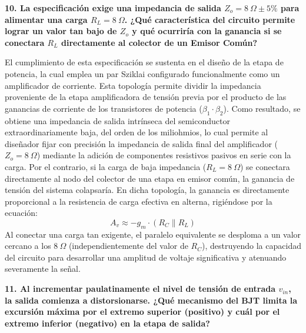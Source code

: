 \textbf{10. La especificación exige una impedancia de salida $Z_o = 8\ \Omega \pm 5\%$ para alimentar una carga $R_L = 8\ \Omega$. ¿Qué característica del circuito permite lograr un valor tan bajo de $Z_o$ y qué ocurriría con la ganancia si se conectara $R_L$ directamente al colector de un Emisor Común?}

El cumplimiento de esta especificación se sustenta en el diseño de la etapa de potencia, la cual emplea un par Sziklai configurado funcionalmente como un amplificador de corriente. Esta topología permite dividir la impedancia proveniente de la etapa amplificadora de tensión previa por el producto de las ganancias de corriente de los transistores de potencia ($\beta_1 \cdot \beta_2$). Como resultado, se obtiene una impedancia de salida intrínseca del semiconductor extraordinariamente baja, del orden de los miliohmios, lo cual permite al diseñador fijar con precisión la impedancia de salida final del amplificador ($Z_o = 8\ \Omega$) mediante la adición de componentes resistivos pasivos en serie con la carga. Por el contrario, si la carga de baja impedancia ($R_L = 8\ \Omega$) se conectara directamente al nodo del colector de una etapa en emisor común, la ganancia de tensión del sistema colapsaría. En dicha topología, la ganancia es directamente proporcional a la resistencia de carga efectiva en alterna, rigiéndose por la ecuación:
$$A_v \approx -g_m \cdot (R_C \parallel R_L)$$
Al conectar una carga tan exigente, el paralelo equivalente se desploma a un valor cercano a los $8\ \Omega$ (independientemente del valor de $R_C$), destruyendo la capacidad del circuito para desarrollar una amplitud de voltaje significativa y atenuando severamente la señal.

\textbf{11. Al incrementar paulatinamente el nivel de tensión de entrada $v_{in}$, la salida comienza a distorsionarse. ¿Qué mecanismo del BJT limita la excursión máxima por el extremo superior (positivo) y cuál por el extremo inferior (negativo) en la etapa de salida?}


